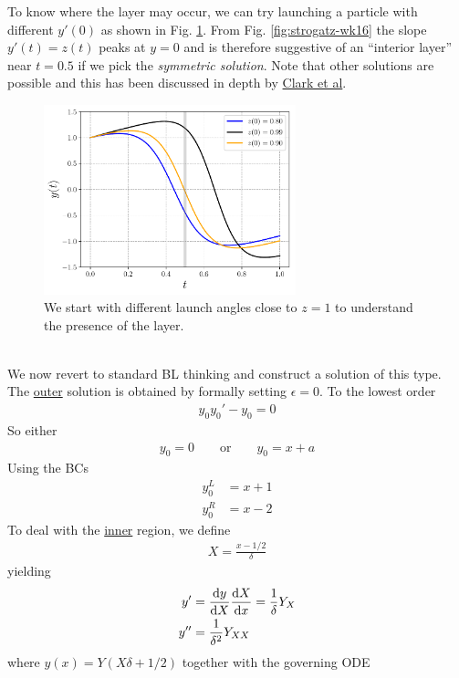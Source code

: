 To know where the layer may occur, we can try launching a particle with different $y'(0)$ as shown in Fig. \ref{fig:strogatz-wk16-z-guess}. From Fig. \ref{fig:strogatz-wk16} the slope $y'(t)=z(t)$ peaks at $y=0$ and is therefore suggestive of an ``interior layer'' near $t=0.5$ if we pick the \emph{symmetric solution}. Note that other solutions are possible and this has been discussed in depth by \href{https://arxiv.org/abs/2107.11624}{Clark et al}. 
\begin{figure}[!h]
	\centering
	\includegraphics[width=0.65\textwidth]{./plots/pdf/strogatz-wk16-z-guess.pdf}
	\caption{We start with different launch angles close to $z=1$ to understand the presence of the layer.}
	\label{fig:strogatz-wk16-z-guess}
\end{figure}\\
We now revert to standard BL thinking and construct a solution of this type. The \underline{outer} solution is obtained by formally setting $\epsilon=0$. To the lowest order
\begin{gather*}
	y_0 y_0' - y_0 = 0
\end{gather*}
So either 
\begin{gather*}
	y_0 = 0 \qquad \text{or} \qquad  y_0 = x + a
\end{gather*}
Using the BCs
\begin{align*}
	y_0^L & = x+1 \\
	y_0^R & = x-2
\end{align*}
To deal with the \underline{inner} region, we define
\begin{gather*}
	X = \frac{x-1/2}{\delta}
\end{gather*}
yielding
\begin{align*}
	y' &= \frac{\mathrm{d} y}{\mathrm{d} X} \frac{\mathrm{d} X}{\mathrm{d} x} = \frac{1}{\delta} Y_X \\
	y'' &= \frac{1}{\delta^2} Y_{XX}
\end{align*}
where $y(x)=Y(X\delta + 1/2)$ together with the governing ODE

